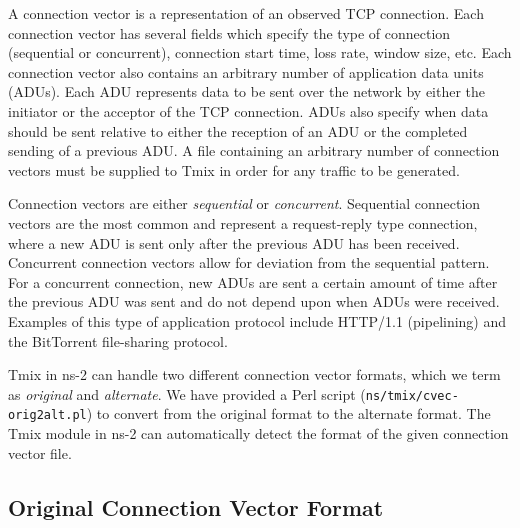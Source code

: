 A connection vector is a representation of an observed TCP connection.
Each connection vector has several fields which specify the type of
connection (sequential or concurrent), connection start time, loss
rate, window size, etc.  Each connection vector also contains an
arbitrary number of application data units (ADUs).  Each ADU represents
data to be sent over the network by either the initiator or the
acceptor of the TCP connection.  ADUs also specify when data should be
sent relative to either the reception of an ADU or the completed
sending of a previous ADU.  A file containing an arbitrary number of
connection vectors must be supplied to Tmix in order for any traffic
to be generated.  

Connection vectors are either \emph{sequential} or \emph{concurrent}.
Sequential connection vectors are the most common and represent a
request-reply type connection, where a new ADU is sent only after the
previous ADU has been received.  Concurrent connection vectors allow
for deviation from the sequential pattern.  For a concurrent
connection, new ADUs are sent a certain amount of time after the
previous ADU was sent and do not depend upon when ADUs were
received. Examples of this type of application protocol include
HTTP/1.1 (pipelining) and the BitTorrent file-sharing protocol.

Tmix in ns-2 can handle two different connection vector formats, which
we term as \emph{original} and \emph{alternate}.  We have provided a Perl
script ({\tt ns/tmix/cvec-orig2alt.pl}) to convert from the original format to
the alternate format.  The Tmix module in ns-2 can automatically
detect the format of the given connection vector file.


\subsection{Original Connection Vector Format}

